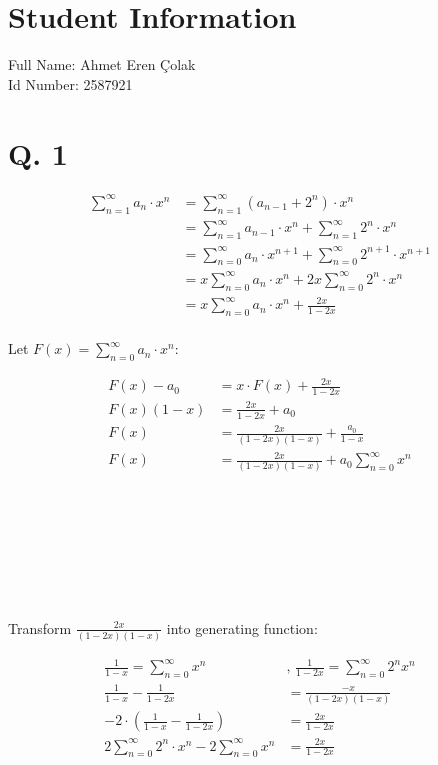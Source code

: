 \documentclass[12pt]{article}
\begin{document}
\section*{Student Information}
Full Name: Ahmet Eren Çolak \\
Id Number: 2587921 \\

\section*{Q. 1}

\begin{align*}
    \sum_{n=1}^{\infty} a_n \cdot x^n &= \sum_{n=1}^{\infty} (a_{n-1} + 2^n) \cdot x^n  \\
    &= \sum_{n=1}^{\infty} a_{n-1} \cdot x^n + \sum_{n=1}^{\infty} 2^n \cdot x^n \\
    &= \sum_{n=0}^{\infty} a_{n} \cdot x^{n+1} + \sum_{n=0}^{\infty} 2^{n+1} \cdot x^{n+1} \\
    &= x \sum_{n=0}^{\infty} a_n \cdot x^n + 2x\sum_{n=0}^{\infty} 2^n \cdot x^n \\
    &= x \sum_{n=0}^{\infty} a_n \cdot x^n + \frac{2x}{1-2x} \\
\end{align*}

Let $F(x)=\sum_{n=0}^{\infty} a_n \cdot x^n$:

\begin{align*}
    F(x) - a_0 &= x \cdot F(x) + \frac{2x}{1-2x}\\
    F(x)(1-x) &= \frac{2x}{1-2x} + a_0\\
    F(x) &= \frac{2x}{(1-2x)(1-x)} + \frac{a_0}{1-x}\\
    F(x) &= \frac{2x}{(1-2x)(1-x)} + a_0\sum_{n=0}^{\infty} x^n \\
\end{align*}
\\ \\ \\ \\ \\ \\ \\
Transform $\frac{2x}{(1-2x)(1-x)}$ into generating function:

\begin{align*}
    \frac{1}{1-x} = \sum_{n=0}^{\infty} x^n &\text{, } \frac{1}{1-2x} = \sum_{n=0}^{\infty} 2^nx^n \\
    \frac{1}{1-x} - \frac{1}{1-2x} &= \frac{-x}{(1-2x)(1-x)} \\
    -2\cdot(\frac{1}{1-x} - \frac{1}{1-2x}) &= \frac{2x}{1-2x} \\
    2\sum_{n=0}^{\infty} 2^n\cdot x^n - 2\sum_{n=0}^{\infty} x^n &= \frac{2x}{1-2x} \\
\end{align*}
\end{document}

